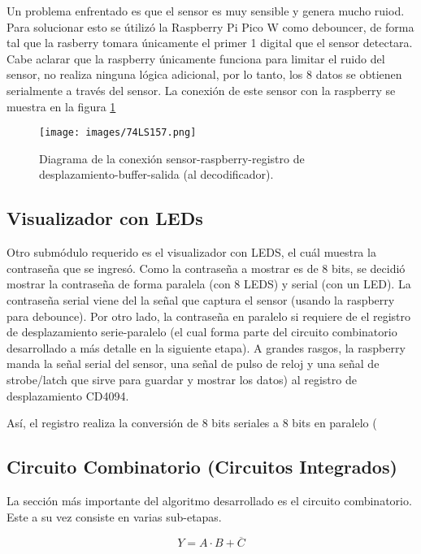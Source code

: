 \documentclass[conference]{IEEEtran}  %
\begin{document}
Un problema enfrentado es que el sensor es muy sensible y genera mucho ruiod. Para solucionar esto se útilizó la Raspberry Pi Pico W como debouncer, de forma tal que la rasberry tomara únicamente el primer 1 digital que el sensor detectara. Cabe aclarar que la raspberry únicamente funciona para limitar el ruido del sensor, no realiza ninguna lógica adicional, por lo tanto, los 8 datos se obtienen serialmente a través del sensor. La conexión de este sensor con la raspberry se muestra en la figura \ref{fig:diagrama1}

\begin{figure}[h]
    \centering
    \texttt{[image: images/74LS157.png]}
    \caption{Diagrama de la conexión sensor-raspberry-registro de desplazamiento-buffer-salida (al decodificador).}
    \label{fig:diagrama1}
\end{figure}

\subsection{Visualizador con LEDs}

Otro submódulo requerido es el visualizador con LEDS, el cuál muestra la contraseña que se ingresó. Como la contraseña a mostrar es de 8 bits, se decidió mostrar la contraseña de forma paralela (con 8 LEDS) y serial (con un LED). La contraseña serial viene del la señal que captura el sensor (usando la raspberry para debounce). Por otro lado, la contraseña en paralelo si requiere de el registro de desplazamiento serie-paralelo (el cual forma parte del circuito combinatorio desarrollado a más detalle en la siguiente etapa). A grandes rasgos, la raspberry manda la señal serial del sensor, una señal de pulso de reloj y una señal de strobe/latch que sirve para guardar y mostrar los datos) al registro de desplazamiento CD4094. 

Así, el registro realiza la conversión de 8 bits seriales a 8 bits en paralelo (

\subsection{Circuito Combinatorio (Circuitos Integrados)}

La sección más importante del algoritmo desarrollado es el circuito combinatorio. Este a su vez consiste en varias sub-etapas. 

\begin{equation}
Y = A \cdot B + \overline{C}
\end{equation}
\end{document}
